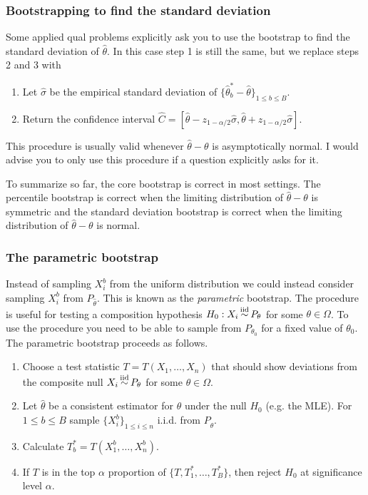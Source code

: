 \subsubsection*{Bootstrapping to find the standard deviation}

Some applied qual problems explicitly ask you to use the bootstrap to find the standard deviation of $\hat{\theta}$. In this case step 1 is still the same, but we replace steps 2 and 3 with
\begin{enumerate}[label={\arabic*$''.$},start=2]
\item 
Let $\hat{\sigma}$ be the empirical standard deviation of $\{\hat{\theta}^*_b - \hat{\theta} \}_{1 \leq b \leq B}$.
\item
Return the confidence interval $\hat{C} = [\hat{\theta} - z_{1-\alpha/2}\hat{\sigma}, \hat{\theta} + z_{1-\alpha/2}\hat{\sigma}]$.
\end{enumerate}
This procedure is usually valid whenever $\hat{\theta} - \theta$ is asymptotically normal. I would advise you to only use this procedure if a question explicitly asks for it.

To summarize so far, the core bootstrap is correct in most settings. The percentile bootstrap is correct when the limiting distribution of $\hat{\theta}-\theta$ is symmetric and the standard deviation bootstrap is correct when the limiting distribution of $\hat{\theta}-\theta$ is normal.




\subsubsection*{The parametric bootstrap}

Instead of sampling $X_i^b$ from the uniform distribution we could instead consider sampling $X_i^b$ from $P_{\hat{\theta}}$. This is known as the \textit{parametric} bootstrap. The procedure is useful for testing a composition hypothesis $H_0:X_i \simiid P_\theta$ for some $\theta \in \Omega$. To use the procedure you need to be able to sample from $P_{\theta_0}$ for a fixed value of $\theta_0$. The parametric bootstrap proceeds as follows. 

\begin{enumerate}[start = 0]
  \item Choose a test statistic $T = T(X_1,\ldots,X_n)$ that should show deviations from the composite null $X_i \simiid P_\theta$ for some $\theta \in \Omega$. 
  \item Let $\hat{\theta}$ be a consistent estimator for $\theta$ under the null $H_0$ (e.g. the MLE). For $1 \le b \le B$ sample $\{X_i^b\}_{1 \le i \le n}$ i.i.d. from $P_{\hat{\theta}}$. 
  \item Calculate $T^*_b= T(X_1^b,\ldots, X_n^b)$.
  \item If $T$ is in the top $\alpha$ proportion of $\{T,T_1^*,\ldots,T_B^*\}$, then reject $H_0$ at significance level $\alpha$.
\end{enumerate}

